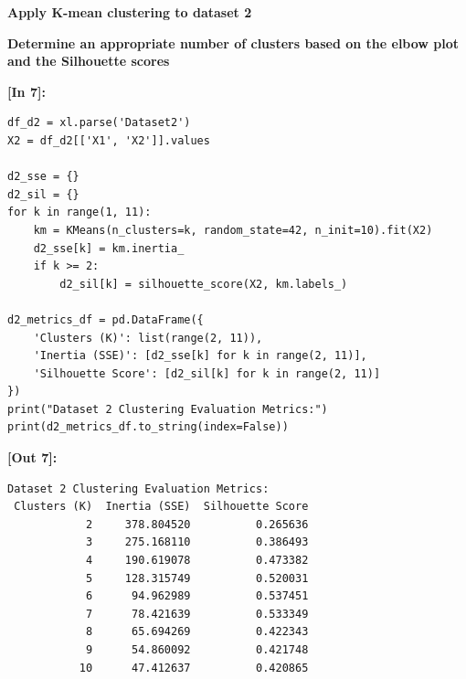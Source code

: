 \vspace{0.3em}
\begin{tcolorbox}[colback=gray!5!white,colframe=gray!50!black,boxrule=0.5pt,arc=2pt,left=4pt,right=4pt,top=2pt,bottom=2pt,unbreakable,before upper={\sloppy\raggedright}]
{\small\bfseries Apply K-mean clustering to dataset 2\par}
\end{tcolorbox}

\vspace{0.3em}
\begin{tcolorbox}[colback=gray!5!white,colframe=gray!50!black,boxrule=0.5pt,arc=2pt,left=4pt,right=4pt,top=2pt,bottom=2pt,unbreakable,before upper={\sloppy\raggedright}]
{\small\bfseries Determine an appropriate number of clusters based on the elbow plot and the Silhouette scores\par}
\end{tcolorbox}

\vspace{0.4em}
\noindent\textbf{\small [In 7]:}
\begin{lstlisting}[style=pycode]
df_d2 = xl.parse('Dataset2')
X2 = df_d2[['X1', 'X2']].values

d2_sse = {}
d2_sil = {}
for k in range(1, 11):
    km = KMeans(n_clusters=k, random_state=42, n_init=10).fit(X2)
    d2_sse[k] = km.inertia_
    if k >= 2:
        d2_sil[k] = silhouette_score(X2, km.labels_)

d2_metrics_df = pd.DataFrame({
    'Clusters (K)': list(range(2, 11)),
    'Inertia (SSE)': [d2_sse[k] for k in range(2, 11)],
    'Silhouette Score': [d2_sil[k] for k in range(2, 11)]
})
print("Dataset 2 Clustering Evaluation Metrics:")
print(d2_metrics_df.to_string(index=False))
\end{lstlisting}
\noindent\textbf{\small [Out 7]:}
\begin{lstlisting}[style=output]
Dataset 2 Clustering Evaluation Metrics:
 Clusters (K)  Inertia (SSE)  Silhouette Score
            2     378.804520          0.265636
            3     275.168110          0.386493
            4     190.619078          0.473382
            5     128.315749          0.520031
            6      94.962989          0.537451
            7      78.421639          0.533349
            8      65.694269          0.422343
            9      54.860092          0.421748
           10      47.412637          0.420865
\end{lstlisting}

